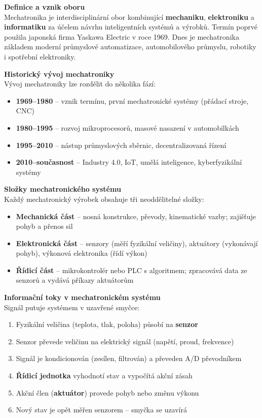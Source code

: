 \documentclass[a4paper,10pt]{article}
\begin{document}
\begin{vysvetlenibox}
\textbf{Definice a vznik oboru}\\
Mechatronika je interdisciplinární obor kombinující \textbf{mechaniku},
\textbf{elektroniku} a \textbf{informatiku} za účelem návrhu inteligentních
systémů a výrobků. Termín poprvé použila japonská firma Yaskawa Electric
v roce 1969. Dnes je mechatronika základem moderní průmyslové automatizace,
automobilového průmyslu, robotiky i spotřební elektroniky.

\textbf{Historický vývoj mechatroniky}\\
Vývoj mechatroniky lze rozdělit do několika fází:
\begin{itemize}[noitemsep, leftmargin=1.4em, topsep=4pt]
    \item \textbf{1969--1980} -- vznik termínu, první mechatronické systémy (přádací stroje, CNC)
    \item \textbf{1980--1995} -- rozvoj mikroprocesorů, masové nasazení v automobilkách
    \item \textbf{1995--2010} -- nástup průmyslových sběrnic, decentralizovaná řízení
    \item \textbf{2010--současnost} -- Industry 4.0, IoT, umělá inteligence, kyberfyzikální systémy
\end{itemize}

\textbf{Složky mechatronického systému}\\
Každý mechatronický výrobek obsahuje tři neoddělitelné složky:
\begin{itemize}[noitemsep, leftmargin=1.4em, topsep=4pt]
    \item \textbf{Mechanická část} -- nosná konstrukce, převody, kinematické
          vazby; zajišťuje pohyb a přenos sil
    \item \textbf{Elektronická část} -- senzory (měří fyzikální veličiny),
          aktuátory (vykonávají pohyb), výkonová elektronika (řídí výkon)
    \item \textbf{Řídicí část} -- mikrokontrolér nebo PLC s algoritmem;
          zpracovává data ze senzorů a vydává příkazy aktuátorům
\end{itemize}

\textbf{Informační toky v mechatronickém systému}\\
Signál putuje systémem v uzavřené smyčce:
\begin{enumerate}[noitemsep, leftmargin=1.4em, topsep=4pt]
    \item Fyzikální veličina (teplota, tlak, poloha) působí na \textbf{senzor}
    \item Senzor převede veličinu na elektrický signál (napětí, proud, frekvence)
    \item Signál je kondicionován (zesílen, filtrován) a převeden A/D převodníkem
    \item \textbf{Řídicí jednotka} vyhodnotí stav a vypočítá akční zásah
    \item Akční člen (\textbf{aktuátor}) provede pohyb nebo změnu výkonu
    \item Nový stav je opět měřen senzorem -- smyčka se uzavírá
\end{enumerate}


\end{vysvetlenibox}
\end{document}
